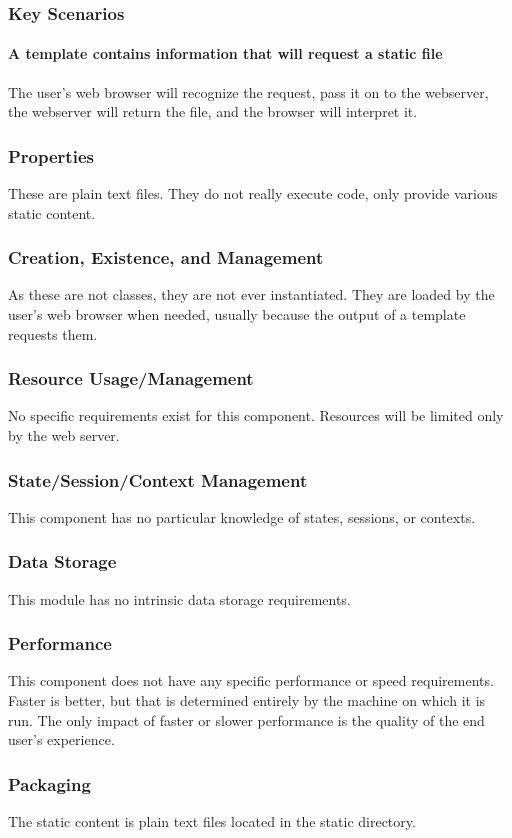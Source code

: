 \documentclass[12pt,titlepage]{article}
\begin{document}
\subsubsection{Key Scenarios}
\paragraph{A template contains information that will request a static file}
The user's web browser will recognize the request, pass it on to the webserver, the webserver will return the file, and the browser will interpret it.
\subsubsection{Properties}
These are plain text files.  They do not really execute code, only provide various static content.
\subsubsection{Creation, Existence, and Management}
As these are not classes, they are not ever instantiated.  They are loaded by the user's web browser when needed, usually because the output of a template requests them.
\subsubsection{Resource Usage/Management}
No specific requirements exist for this component.  Resources will be limited only by the web server.
\subsubsection{State/Session/Context Management}
This component has no particular knowledge of states, sessions, or contexts.
\subsubsection{Data Storage}
This module has no intrinsic data storage requirements.
\subsubsection{Performance}
This component does not have any specific performance or speed requirements.  Faster is better, but that is determined entirely by the machine on which it is run.  The only impact of faster or slower performance is the quality of the end user's experience.
\subsubsection{Packaging}
The static content is plain text files located in the static directory.
\end{document}
